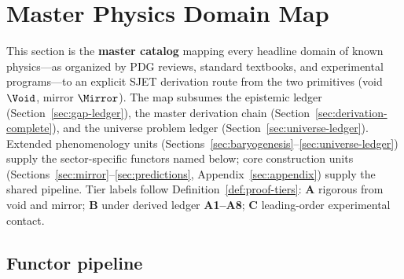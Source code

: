 \section{Master Physics Domain Map}
\label{sec:physics-map}

This section is the \textbf{master catalog} mapping every headline domain of
known physics---as organized by PDG reviews, standard textbooks, and
experimental programs---to an explicit SJET derivation route from the two
primitives (void $\Void$, mirror $\Mirror$). The map subsumes the epistemic
ledger (Section~\ref{sec:gap-ledger}), the master derivation chain
(Section~\ref{sec:derivation-complete}), and the universe problem ledger
(Section~\ref{sec:universe-ledger}). Extended phenomenology units
(Sections~\ref{sec:baryogenesis}--\ref{sec:universe-ledger}) supply the
sector-specific functors named below; core construction units
(Sections~\ref{sec:mirror}--\ref{sec:predictions}, Appendix~\ref{sec:appendix})
supply the shared pipeline. Tier labels follow Definition~\ref{def:proof-tiers}:
\textbf{A} rigorous from void and mirror; \textbf{B} under derived ledger
\textbf{A1--A8}; \textbf{C} leading-order experimental contact.

\subsection{Functor pipeline}
\label{sec:physics-map:pipeline}

